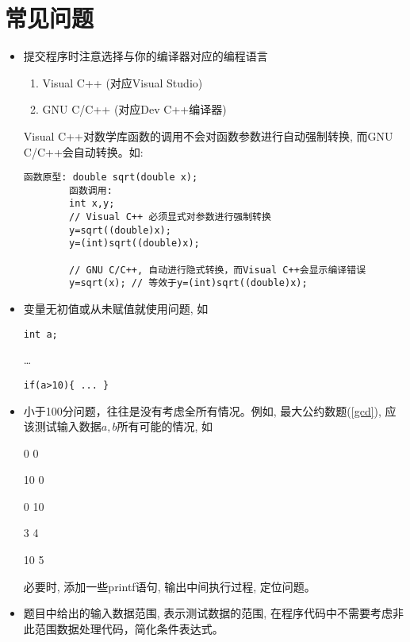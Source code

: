 %
%
%

\chapter{常见问题}

\begin{itemize}
	\item 提交程序时注意选择与你的编译器对应的编程语言
			\begin{enumerate}[(1)]
				\item Visual C++ (对应Visual Studio)
				\item GNU C/C++ (对应Dev C++编译器)
			\end{enumerate}	
		
		Visual C++对数学库函数的调用不会对函数参数进行自动强制转换, 而GNU C/C++会自动转换。如:
		\begin{lstlisting}[frame=none]
		函数原型: double sqrt(double x);
		函数调用:
		int x,y;	
		// Visual C++ 必须显式对参数进行强制转换
		y=sqrt((double)x);      
		y=(int)sqrt((double)x); 
		
		// GNU C/C++, 自动进行隐式转换，而Visual C++会显示编译错误
		y=sqrt(x); // 等效于y=(int)sqrt((double)x); 
		\end{lstlisting}
		
	\item 变量无初值或从未赋值就使用问题, 如
	
	\lstinline|int a;|
	
	\dots
	
	\lstinline|if(a>10){ ... }|
		
	\item 小于100分问题，往往是没有考虑全所有情况。例如, 最大公约数题(\ref{gcd}), 应该测试输入数据$a,b$所有可能的情况, 如
	
	0 0
	
	10 0
	
	0 10
	
	3 4
	
	10 5
	
	必要时, 添加一些printf语句, 输出中间执行过程, 定位问题。
	 
	\item 题目中给出的输入数据范围, 表示测试数据的范围, 在程序代码中不需要考虑非此范围数据处理代码，简化条件表达式。
	

\end{itemize}

